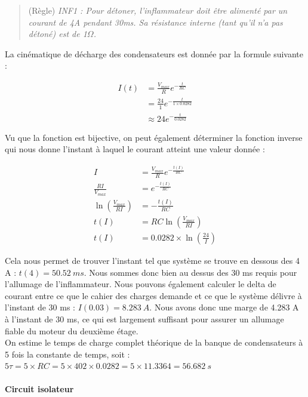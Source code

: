\begin{quote}
    (Règle) \textit{INF1 : Pour détoner, l’inflammateur doit être alimenté par un courant de 4A pendant 30ms.
    Sa résistance interne (tant qu’il n’a pas détoné) est de 1$\Omega$.}\newline\cite[p.~73]{CDC_BiEtage}
\end{quote}

La cinématique de décharge des condensateurs est donnée par la formule suivante :

\begin{align*}
    I(t) &= \frac{V_{max}}{R} e^{-\frac{t}{RC}} \\
    &= \frac{24}{1} e^{-\frac{t}{1\times0.0282}} \\
    &\approx 24e^{-\frac{t}{0.0282}}
\end{align*}

Vu que la fonction est bijective, on peut également déterminer la fonction inverse qui nous donne l'instant à laquel le courant
atteint une valeur donnée :

\begin{align*}
    I &= \frac{V_{max}}{R} e^{-\frac{t(I)}{RC}} \\
    \frac{RI}{V_{max}} &= e^{-\frac{t(I)}{RC}} \\
    \ln{\left(\frac{V_{max}}{RI}\right)} &= -\frac{t(I)}{RC} \\
    t(I) &= RC\ln{\left(\frac{V_{max}}{RI}\right)} \\
    t(I) &= 0.0282 \times \ln{\left(\frac{24}{I}\right)}
\end{align*}

Cela nous permet de trouver l'instant tel que système se trouve en dessous des 4 A : $t(4) = 50.52\ ms$. Nous sommes donc
bien au dessus des 30 ms requis pour l'allumage de l'inflammateur. Nous pouvons également calculer le delta de courant entre
ce que le cahier des charges demande et ce que le système délivre à l'instant de 30 ms : $I(0.03) = 8.283\ A$. Nous avons donc une
marge de 4.283 A à l'instant de 30 ms, ce qui est largement suffisant pour assurer un allumage fiable du moteur du deuxième étage.\\

On estime le temps de charge complet théorique de la banque de condensateurs à 5 fois la constante de temps, soit :
$5\tau = 5\times RC = 5 \times 402 \times 0.0282 = 5 \times 11.3364 = 56.682\ s$

\newpage

\paragraph*{Circuit isolateur}

